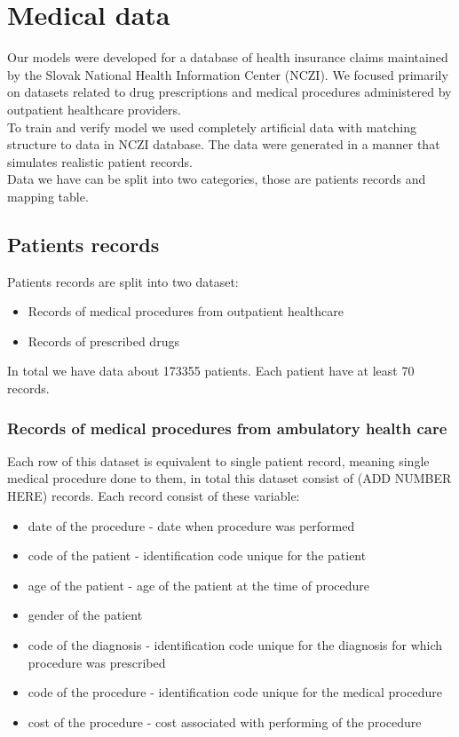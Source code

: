 
\chapter{Medical data} \label{chap:data}

Our models were developed for a database of health insurance claims maintained by the Slovak National Health Information Center (NCZI). We focused primarily on datasets related to drug prescriptions and medical procedures administered by outpatient healthcare providers.
\\

To train and verify model we used completely artificial data with matching structure to data in NCZI database. The data were generated in a manner that simulates realistic patient records.
\\

Data we have can be split into two categories, those are patients records and mapping table. 

\section{Patients records}

Patients records are split into two dataset:
\begin{itemize}
	\item Records of medical procedures from outpatient healthcare
	\item Records of prescribed drugs
\end{itemize}

In total we have data about 173355 patients. Each patient have at least 70 records.

\subsection{Records of medical procedures from ambulatory health care}

Each row of this dataset is equivalent to single patient record, meaning single medical procedure done to them, in total this dataset consist of (ADD NUMBER HERE) records. Each record consist of these variable:
\begin{itemize}
	\item date of the procedure - date when procedure was performed
	\item code of the patient - identification code unique for the patient
	\item age of the patient - age of the patient at the time of procedure
	\item gender of the patient
	\item code of the diagnosis - identification code unique for the diagnosis for which procedure was prescribed
	\item code of the procedure - identification code unique for the medical procedure 
	\item cost of the procedure - cost associated with performing of the procedure
\end{itemize}

